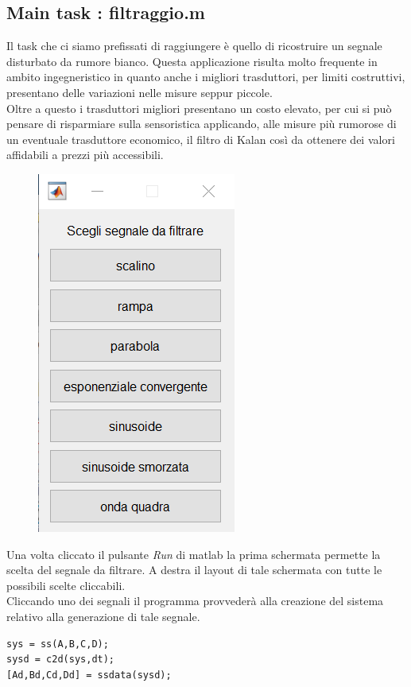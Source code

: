 \subsection{Main task : filtraggio.m}
Il task che ci siamo prefissati di raggiungere è quello di ricostruire un segnale disturbato da rumore bianco. Questa applicazione risulta molto frequente in ambito ingegneristico in quanto anche i migliori trasduttori, per limiti costruttivi, presentano delle variazioni nelle misure seppur piccole.\\
Oltre a questo i trasduttori migliori presentano un costo elevato, per cui si può pensare di risparmiare sulla sensoristica applicando, alle misure più rumorose di un eventuale trasduttore economico, il filtro di Kalan così da ottenere dei valori affidabili a prezzi più accessibili.
\\
\begin{figure}
\centering
\includegraphics[scale=.7]{immaginiMain/mainfilterPOSS.png} 
\end{figure}
Una volta cliccato il pulsante \textit{Run} di matlab la prima schermata permette la scelta del segnale da filtrare.
A destra il layout di tale schermata con tutte le possibili scelte cliccabili.\\
Cliccando uno dei segnali il programma provvederà alla creazione del sistema relativo alla generazione di tale segnale.
\begin{lstlisting}[frame=single]
sys = ss(A,B,C,D);
sysd = c2d(sys,dt);
[Ad,Bd,Cd,Dd] = ssdata(sysd);
\end{lstlisting}
